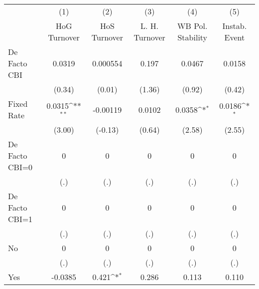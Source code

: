 \begin{table}[htbp]\centering
\def\sym#1{\ifmmode^{#1}\else\(^{#1}\)\fi}
\caption{\label{ifullicmultIndFEDF}}
\begin{tabular}{l*{5}{c}}
\toprule
                                        &\multicolumn{1}{c}{(1)}&\multicolumn{1}{c}{(2)}&\multicolumn{1}{c}{(3)}&\multicolumn{1}{c}{(4)}&\multicolumn{1}{c}{(5)}\\
                                        &\multicolumn{1}{c}{HoG Turnover}&\multicolumn{1}{c}{HoS Turnover}&\multicolumn{1}{c}{L. H. Turnover}&\multicolumn{1}{c}{WB Pol. Stability}&\multicolumn{1}{c}{Instab. Event}\\
\midrule
De Facto CBI                            &   0.0319         & 0.000554         &    0.197         &   0.0467         &   0.0158         \\
                                        &   (0.34)         &   (0.01)         &   (1.36)         &   (0.92)         &   (0.42)         \\
\addlinespace
Fixed Rate                              &   0.0315\sym{**} & -0.00119         &   0.0102         &   0.0358\sym{*}  &   0.0186\sym{*}  \\
                                        &   (3.00)         &  (-0.13)         &   (0.64)         &   (2.58)         &   (2.55)         \\
\addlinespace
De Facto CBI=0                          &        0         &        0         &        0         &        0         &        0         \\
                                        &      (.)         &      (.)         &      (.)         &      (.)         &      (.)         \\
\addlinespace
De Facto CBI=1                          &        0         &        0         &        0         &        0         &        0         \\
                                        &      (.)         &      (.)         &      (.)         &      (.)         &      (.)         \\
\addlinespace
No                                      &        0         &        0         &        0         &        0         &        0         \\
                                        &      (.)         &      (.)         &      (.)         &      (.)         &      (.)         \\
\addlinespace
Yes                                     &  -0.0385         &    0.421\sym{*}  &    0.286         &    0.113         &    0.110         \\

\end{tabular}
\end{table}
